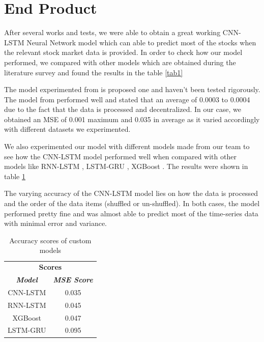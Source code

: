 \documentclass[conference]{IEEEtran}
\begin{document}
\FloatBarrier
\section{End Product}

After several works and tests, we were able to obtain a great working CNN-LSTM Neural Network model which can able to predict most of the stocks when the relevant stock market data is provided. In order to check how our model performed, we compared with other models which are obtained during the literature survey and found the results in the table \ref{tab1}

The model experimented from \cite{b3} is proposed one and haven't been tested rigorously. The model from \cite{b9} performed well and stated that an average of 0.0003 to 0.0004 due to the fact that the data is processed and decentralized. In our case, we obtained an MSE of 0.001 maximum and 0.035 in average as it varied accordingly with different datasets we experimented.

We also experimented our model with different models made from our team to see how the CNN-LSTM model performed well when compared with other models like RNN-LSTM \cite{b25}, LSTM-GRU \cite{b26}, XGBoost \cite{b27}. The results were shown in table \ref{tab2}

The varying accuracy of the CNN-LSTM model lies on how the data is processed and the order of the data items (shuffled or un-shuffled). In both cases, the model performed pretty fine and was almost able to predict most of the time-series data with minimal error and variance.

\begin{table}[htbp]
	\caption{Accuracy scores of custom models}
	\begin{center}
		\begin{tabular}{|c|c|}
			\hline
			\multicolumn{2}{|c|}{\textbf{Scores}} \\
			\cline{1-2} 
			\textbf{\textit{Model}}& \textbf{\textit{MSE Score}} \\
			\hline
			CNN-LSTM & 0.035 \\
			\hline
			RNN-LSTM \cite{b25} & 0.045 \\
			\hline
			XGBoost \cite{b27} & 0.047 \\
			\hline
			LSTM-GRU \cite{b26} & 0.095 \\
			\hline
		\end{tabular}
		\label{tab2}
	\end{center}
\end{table}
\end{document}
